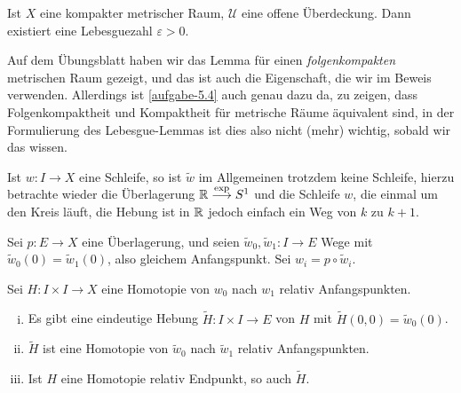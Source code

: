 \begin{lemma*}\label{lm:lebesgue}
    Ist $X$ eine kompakter metrischer Raum,  $\mathcal{U}$ eine offene Überdeckung. Dann existiert eine Lebesguezahl $ε>0$.
\end{lemma*}

\begin{remark*}
    Auf dem Übungsblatt haben wir das Lemma für einen \textit{folgenkompakten} metrischen Raum gezeigt, und das ist auch die Eigenschaft, die wir im Beweis verwenden. Allerdings ist \autoref{aufgabe-5.4} auch genau dazu da, zu zeigen, dass Folgenkompaktheit und Kompaktheit für metrische Räume äquivalent sind, in der Formulierung des Lebesgue-Lemmas ist dies also nicht (mehr) wichtig, sobald wir das wissen.
\end{remark*}

\begin{remark}
    Ist $w\colon  I \to  X$ eine Schleife, so ist $\tilde{w}$ im Allgemeinen trotzdem keine Schleife, hierzu betrachte wieder die Überlagerung $\mathbb{R} \stackrel{\exp }{\longrightarrow} S^1$ und die Schleife $w$, die einmal um den Kreis läuft, die Hebung ist in $\mathbb{R}$ jedoch einfach ein Weg von $k$ zu $k+1$.


    \begin{minipage}{\textwidth}
    \centering
    \label{fig:hebung-von-schleife-zu-weg}
    \end{minipage}
\end{remark}

\begin{theorem}[Homotopieliftungssatz]\label{thm:homotopieliftungssatz}
    Sei $p\colon  E \to  X$ eine Überlagerung, und seien $\tilde{w}_0, \tilde{w}_1\colon  I \to  E$ Wege mit $\tilde{w}_0(0) = \tilde{w}_1(0)$, also gleichem Anfangspunkt. Sei $w_i = p \circ  \tilde{w}_i$.

    Sei $H\colon  I \times I \to  X$ eine Homotopie von $w_0$ nach $w_1$ relativ Anfangspunkten.

    \begin{enumerate}[i)]
        \item Es gibt eine eindeutige Hebung $\tilde{H}\colon  I \times I \to  E$ von $H$ mit  $\tilde{H}(0,0) = \tilde{w}_0(0)$.
        \item $\tilde{H}$ ist eine Homotopie von $\tilde{w}_0$ nach $\tilde{w}_1$ relativ Anfangspunkten.
        \item Ist $H$ eine Homotopie relativ Endpunkt, so auch  $\tilde{H}$.
    \end{enumerate}
\end{theorem}


